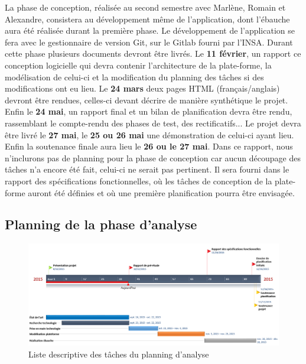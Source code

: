     La phase de conception, réalisée au second semestre avec Marlène, Romain et Alexandre, consistera au développement même
    de l’application, dont l’ébauche aura été réalisée durant la première phase. Le développement de l’application
    se fera avec le gestionnaire de version Git,  sur le Gitlab fourni par l’INSA. Durant cette phase plusieurs
    documents devront être livrés. Le \textbf{11 février}, un rapport ce conception logicielle qui devra
    contenir l’architecture de la plate-forme, la modélisation de celui-ci et la modification du planning
    des tâches si des modifications ont eu lieu. Le \textbf{24 mars} deux pages HTML (français/anglais) devront être
    rendues, celles-ci devant décrire de manière synthétique le projet. Enfin le \textbf{24 mai}, un rapport final et un
    bilan de planification devra être rendu, rassemblant le compte-rendu des phases de test, des rectificatifs...
    Le projet devra être livré le \textbf{27 mai}, le \textbf{25 ou 26 mai} une démonstration de celui-ci ayant lieu. Enfin la
    soutenance finale aura lieu le \textbf{26 ou le 27 mai}. Dans ce rapport, nous n’inclurons pas de planning pour la
    phase de conception car aucun découpage des tâches n’a encore été fait, celui-ci ne serait pas pertinent. Il sera
    fourni dans le rapport des spécifications fonctionnelles, où les tâches de conception de la plate-forme auront été
    définies et où une première planification pourra être envisagée.

    \pagebreak

    \subsection{Planning de la phase d’analyse}
    \label{subsec:planing}

    \begin{figure}[H]
        \centering
        \includegraphics[width=1.3\textwidth, angle=90]{figure/timeline.png}
            \caption{Liste descriptive des tâches du planning d'analyse}
            \label{fig:description}
    \end{figure}

